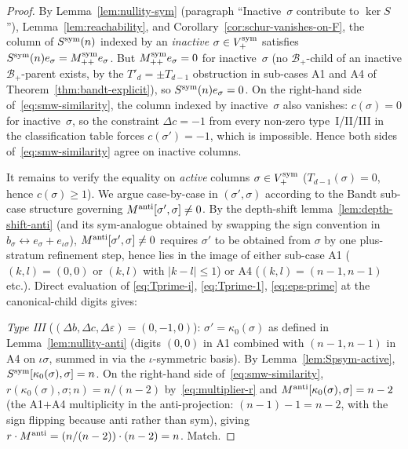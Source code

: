 \documentclass{amsart}
\theoremstyle{definition}
\theoremstyle{remark}
\begin{document}
\begin{proof}
By Lemma~\ref{lem:nullity-sym} (paragraph
``Inactive~$\sigma$ contribute to $\ker S$''),
Lemma~\ref{lem:reachability}, and
Corollary~\ref{cor:schur-vanishes-on-F}, the column of
$S^{\rm sym}(n)$ indexed by an \emph{inactive} $\sigma \in V_+^{\rm sym}$
satisfies $S^{\rm sym}(n) e_\sigma = M_{++}^{\rm sym} e_\sigma$.
But $M_{++}^{\rm sym} e_\sigma = 0$ for inactive~$\sigma$
(no $\mathcal{B}_+$-child of an inactive $\mathcal{B}_+$-parent
exists, by the $T'_d = \pm T_{d-1}$ obstruction in sub-cases A1
and A4 of Theorem~\ref{thm:bandt-explicit}), so
$S^{\rm sym}(n) e_\sigma = 0$.
On the right-hand side of~\eqref{eq:smw-similarity}, the column
indexed by inactive~$\sigma$ also vanishes: $c(\sigma) = 0$ for
inactive~$\sigma$, so the constraint $\Delta c = -1$ from every
non-zero type~I/II/III in the classification table forces
$c(\sigma') = -1$, which is impossible.  Hence both sides
of~\eqref{eq:smw-similarity} agree on inactive columns.

It remains to verify the equality on \emph{active} columns
$\sigma \in V_+^{\rm sym}$ ($T_{d-1}(\sigma) = 0$, hence
$c(\sigma) \ge 1$).  We argue case-by-case in $(\sigma', \sigma)$
according to the Bandt sub-case structure governing
$M^{\rm anti}[\sigma', \sigma] \neq 0$.  By the depth-shift
lemma~\ref{lem:depth-shift-anti} (and its sym-analogue obtained
by swapping the sign convention in $b_\sigma \leftrightarrow
e_\sigma + e_{\iota\sigma}$), $M^{\rm anti}[\sigma', \sigma]
\neq 0$ requires $\sigma'$ to be obtained from $\sigma$ by one
plus-stratum refinement step, hence lies in the image of either
sub-case A1 ($(k, l) = (0, 0)$ or $(k, l)$ with $|k - l| \le 1$)
or A4 ($(k, l) = (n-1, n-1)$ etc.).  Direct evaluation of
\eqref{eq:Tprime-i}, \eqref{eq:Tprime-1}, \eqref{eq:eps-prime}
at the canonical-child digits gives:

\smallskip\noindent\emph{Type III} \textup{($(\Delta b, \Delta c,
\Delta \varepsilon) = (0, -1, 0)$)}: $\sigma' = \kappa_0(\sigma)$ as
defined in Lemma~\ref{lem:nullity-anti} (digits $(0, 0)$ in A1
combined with $(n-1, n-1)$ in A4 on $\iota\sigma$, summed in via
the $\iota$-symmetric basis).  By
Lemma~\ref{lem:Spsym-active}, $S^{\rm sym}[\kappa_0(\sigma), \sigma] = n$.
On the right-hand side of~\eqref{eq:smw-similarity},
$r(\kappa_0(\sigma), \sigma; n) = n/(n-2)$ by~\eqref{eq:multiplier-r}
and $M^{\rm anti}[\kappa_0(\sigma), \sigma] = n - 2$ (the
A1$+$A4 multiplicity in the anti-projection: $(n - 1) - 1 =
n - 2$, with the sign flipping because anti rather than sym),
giving $r \cdot M^{\rm anti} = (n/(n-2)) \cdot (n - 2) = n$.  Match.


\end{proof}
\end{document}
